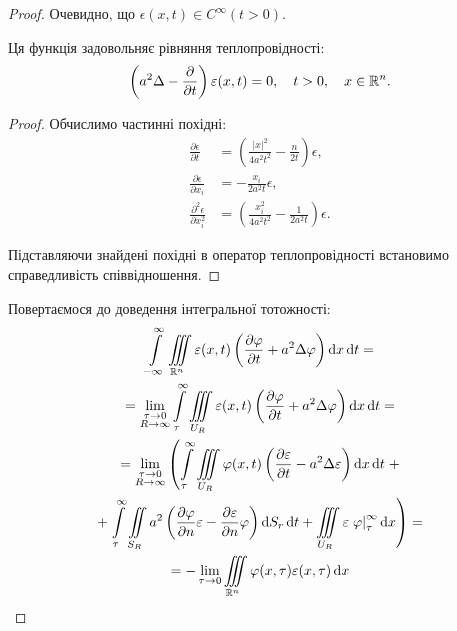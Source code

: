 \begin{proof}
	Очевидно, що $\epsilon(x,t)\in C^\infty(t > 0)$.

	\begin{proposition}
		Ця функція задовольняє рівняння теплопровідності:
		\begin{equation}
			\left( a^2\Delta - \frac{\partial}{\partial t}\right)\varepsilon(x,t) = 0, \quad t > 0, \quad x \in \mathbb{R}^n.
		\end{equation}
	\end{proposition}

	\begin{proof}
		Обчислимо частинні похідні:
		\begin{align}
			\frac{\partial \epsilon}{\partial t} &= \left( \frac{|x|^2}{4a^2t^2}-\frac{n}{2t}\right)\epsilon, \\
			\frac{\partial \epsilon}{\partial x_i} &= -\frac{x_i}{2a^2t}\epsilon, \\
			\frac{\partial^2\epsilon}{\partial x_i^2} &= \left( \frac{x_i^2}{4a^2t^2}-\frac{1}{2a^2t}\right)\epsilon.
		\end{align}

		Підставляючи знайдені похідні в оператор теплопровідності встановимо справедливість співвідношення.
	\end{proof}

	\allowbreak

	Повертаємося до доведення інтегральної тотожності:
	\begin{multline}
		\Int_{-\infty}^\infty \Iiint_{\RR^n} \epsilon(x,t)\left(\frac{\partial\phi}{\partial t}+a^2\Delta\phi\right)\diff x\diff t = \\
		= \Lim_{\substack{\tau\to0\\R \to \infty}} \Int_\tau^\infty \Iiint_{U_R} \epsilon(x,t) \left(\frac{\partial\phi}{\partial t}+a^2\Delta\phi\right)\diff x\diff t = \\
		= \Lim_{\substack{\tau\to0\\R \to \infty}} \left( \Int_\tau^\infty \Iiint_{U_R} \phi(x,t) \left(\frac{\partial\epsilon}{\partial t}-a^2\Delta\epsilon\right)\diff x\diff t \right. + \\
		+ \left. \Int_\tau^\infty \Iint_{S_R} a^2 \left(\frac{\partial\phi}{\partial n}\epsilon-\frac{\partial\epsilon}{\partial n}\phi\right)\diff S_r \diff t + \Iiint_{U_R} \epsilon\left.\phi\right|_\tau^\infty\diff x\right) = \\
		= - \Lim_{\tau \to 0} \Iiint_{\RR^n} \phi(x,\tau)\epsilon(x,\tau)\diff x
	\end{multline}


\end{proof}
